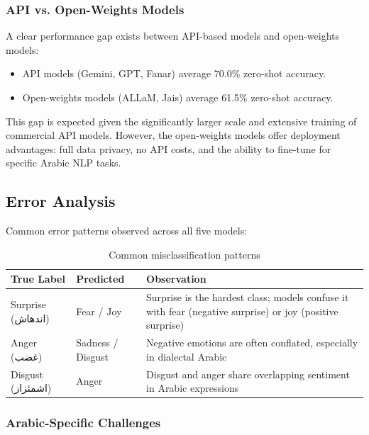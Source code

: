 \subsubsection{API vs. Open-Weights Models}

A clear performance gap exists between API-based models and open-weights models:

\begin{itemize}
    \item API models (Gemini, GPT, Fanar) average 70.0\% zero-shot accuracy.
    \item Open-weights models (ALLaM, Jais) average 61.5\% zero-shot accuracy.
\end{itemize}

This gap is expected given the significantly larger scale and extensive training of commercial API models. However, the open-weights models offer deployment advantages: full data privacy, no API costs, and the ability to fine-tune for specific Arabic NLP tasks.

\subsection{Error Analysis}

Common error patterns observed across all five models:

\begin{table}[H]
    \centering
    \caption{Common misclassification patterns}
    \label{tab:error_patterns}
    \begin{tabular}{|l|l|p{7cm}|}
        \hline
        \textbf{True Label} & \textbf{Predicted} & \textbf{Observation} \\
        \hline
        Surprise (\textarabic{اندهاش}) & Fear / Joy & Surprise is the hardest class; models confuse it with fear (negative surprise) or joy (positive surprise) \\
        \hline
        Anger (\textarabic{غضب}) & Sadness / Disgust & Negative emotions are often conflated, especially in dialectal Arabic \\
        \hline
        Disgust (\textarabic{اشمئزاز}) & Anger & Disgust and anger share overlapping sentiment in Arabic expressions \\
        \hline
    \end{tabular}
\end{table}

\subsubsection{Arabic-Specific Challenges}


